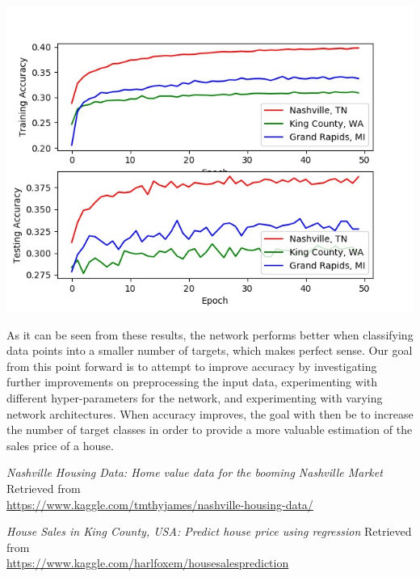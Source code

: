 \documentclass[10pt]{article}
\begin{document}
\begin{multicols}{2}
\begin{center}
			\label{fig:fig_nn_results_5}
		\end{center}
		\begin{center}
            \captionsetup{type=figure}
			\includegraphics[scale=0.38]{NeuralNet/nn_10_class_results} \\
			\label{fig:fig_nn_results_10}
		\end{center}
		As it can be seen from these results, the network performs better when classifying data points into a smaller number of targets, which makes perfect sense. Our goal from this point forward is to attempt to improve accuracy by investigating further improvements on preprocessing the input data, experimenting with different hyper-parameters for the network, and experimenting with varying network architectures. When accuracy improves, the goal with then be to increase the number of target classes in order to provide a more valuable estimation of the sales price of a house.

		\begin{thebibliography}{13}
			\textit{Nashville Housing Data: Home value data for the booming Nashville Market}
			Retrieved from \\ \small{\url{https://www.kaggle.com/tmthyjames/nashville-housing-data/}}
			
			\textit{House Sales in King County, USA: Predict house price using regression}
			Retrieved from \\ \small{\url{https://www.kaggle.com/harlfoxem/housesalesprediction}}	
			

\end{thebibliography}
\end{multicols}
\end{document}
